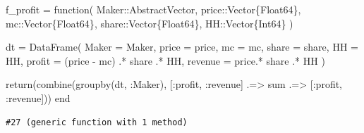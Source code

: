 \documentclass[
  letterpaper,
  DIV=11,
  numbers=noendperiod]{scrreprt}
\newenvironment{Shaded}{\begin{snugshade}}{\end{snugshade}}
\newcommand{\ControlFlowTok}[1]{\textcolor[rgb]{0.00,0.23,0.31}{#1}}
\newcommand{\DataTypeTok}[1]{\textcolor[rgb]{0.68,0.00,0.00}{#1}}
\newcommand{\FunctionTok}[1]{\textcolor[rgb]{0.28,0.35,0.67}{#1}}
\newcommand{\KeywordTok}[1]{\textcolor[rgb]{0.00,0.23,0.31}{#1}}
\newcommand{\NormalTok}[1]{\textcolor[rgb]{0.00,0.23,0.31}{#1}}
\newcommand{\OperatorTok}[1]{\textcolor[rgb]{0.37,0.37,0.37}{#1}}
\begin{document}
\begin{Shaded}
\begin{Highlighting}[]
\NormalTok{f\_profit }\OperatorTok{=} \KeywordTok{function}\NormalTok{(}
\NormalTok{        Maker}\OperatorTok{::}\DataTypeTok{AbstractVector}\NormalTok{, }
\NormalTok{        price}\OperatorTok{::}\DataTypeTok{Vector\{Float64\}}\NormalTok{, }
\NormalTok{        mc}\OperatorTok{::}\DataTypeTok{Vector\{Float64\}}\NormalTok{, }
\NormalTok{        share}\OperatorTok{::}\DataTypeTok{Vector\{Float64\}}\NormalTok{, }
\NormalTok{        HH}\OperatorTok{::}\DataTypeTok{Vector\{Int64\}}
\NormalTok{    )}
    
\NormalTok{    dt }\OperatorTok{=} \FunctionTok{DataFrame}\NormalTok{(}
\NormalTok{        Maker }\OperatorTok{=}\NormalTok{ Maker,}
\NormalTok{        price }\OperatorTok{=}\NormalTok{ price,}
\NormalTok{        mc }\OperatorTok{=}\NormalTok{ mc,}
\NormalTok{        share }\OperatorTok{=}\NormalTok{ share,}
\NormalTok{        HH }\OperatorTok{=}\NormalTok{ HH,}
\NormalTok{        profit }\OperatorTok{=}\NormalTok{ (price }\OperatorTok{{-}}\NormalTok{ mc) }\OperatorTok{.*}\NormalTok{ share }\OperatorTok{.*}\NormalTok{ HH,}
\NormalTok{        revenue }\OperatorTok{=}\NormalTok{ price}\OperatorTok{.*}\NormalTok{ share }\OperatorTok{.*}\NormalTok{ HH}
\NormalTok{    )}
    
    \ControlFlowTok{return}\NormalTok{(}\FunctionTok{combine}\NormalTok{(}\FunctionTok{groupby}\NormalTok{(dt, }\OperatorTok{:}\NormalTok{Maker), [}\OperatorTok{:}\NormalTok{profit, }\OperatorTok{:}\NormalTok{revenue] }\OperatorTok{.=\textgreater{}}\NormalTok{ sum }\OperatorTok{.=\textgreater{}}\NormalTok{ [}\OperatorTok{:}\NormalTok{profit, }\OperatorTok{:}\NormalTok{revenue]))}
\KeywordTok{end}
\end{Highlighting}
\end{Shaded}

\begin{verbatim}
#27 (generic function with 1 method)
\end{verbatim}
\end{document}

